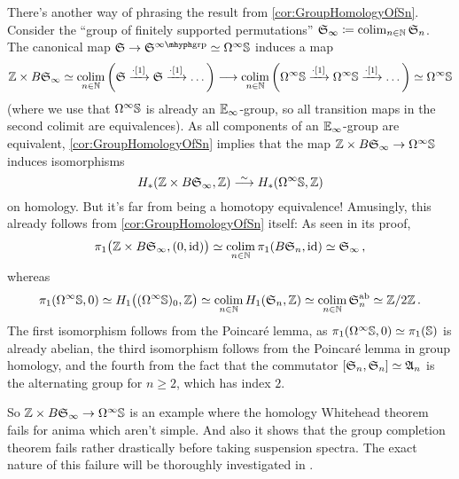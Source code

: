 \numpar*{\thesmallerdummy}
There's another way of phrasing the result from \cref{cor:GroupHomologyOfSn}. Consider the \enquote{group of finitely supported permutations} $\mathfrak{S}_\infty\coloneqq\operatorname*{colim}_{n\in\mathbb{N}}\mathfrak{S}_n$. The canonical map $\SS\morphism\SS^\inftygrp\simeq \Omega^\infty\IS$ induces a map
\begin{equation*}
	\IZ\times B\SS_\infty \simeq\colimit_{n\in\IN}\left(\SS\xrightarrow{\cdot[1]}\SS\xrightarrow{\cdot[1]}\dotso\right)\morphism \colimit_{n\in\IN}\left(\Omega^\infty\IS\xrightarrow{\cdot[1]}\Omega^\infty\IS\xrightarrow{\cdot[1]}\dotso\right)\simeq \Omega^\infty\IS
\end{equation*}
(where we use that $\Omega^\infty\mathbb{S}$ is already an $\mathbb{E}_\infty$-group, so all transition maps in the second colimit are equivalences). 
As all components of an $\mathbb{E}_\infty$-group are equivalent, \cref{cor:GroupHomologyOfSn} implies that the map $\IZ\times B\SS_\infty\morphism \Omega^\infty\IS$ induces isomorphisms
\begin{equation*}
	H_*(\IZ\times B\SS_\infty,\IZ)\isomorphism H_*(\Omega^\infty\IS,\IZ)
\end{equation*}
on homology. But it's far from being a homotopy equivalence! Amusingly, this already follows from \cref{cor:GroupHomologyOfSn} itself: As seen in its proof, 
\begin{equation*}
	\pi_1\big(\mathbb{Z}\times B\mathfrak{S}_\infty,(0,\operatorname{id})\big)\simeq \operatorname*{colim}_{n\in\mathbb{N}}\pi_1(B\mathfrak{S}_n,\operatorname{id})\simeq \mathfrak{S}_\infty\,,
\end{equation*}
whereas
\begin{equation*}
	\pi_1(\Omega^\infty\mathbb{S},0)\simeq H_1\big((\Omega^\infty\mathbb{S})_0,\mathbb{Z}\big)\simeq \operatorname*{colim}_{n\in\mathbb{N}} H_1(\mathfrak{S}_n,\mathbb{Z})\simeq \operatorname*{colim}_{n\in\mathbb{N}}\mathfrak{S}_n^{\mathrm{ab}}\simeq \mathbb{Z}/2\mathbb{Z}\,.
\end{equation*}
The first isomorphism follows from the Poincaré lemma, as $\pi_1(\Omega^\infty\mathbb{S},0)\simeq \pi_1(\mathbb{S})$ is already abelian, the third isomorphism follows from the Poincaré lemma in group homology, and the fourth from the fact that the commutator $[\mathfrak{S}_n,\mathfrak{S}_n]\simeq \mathfrak{A}_n$ is the alternating group for $n\geq 2$, which has index $2$.

So $\IZ\times B\SS_\infty\morphism \Omega^\infty\IS$ is an example where the homology Whitehead theorem fails for anima which aren't simple. And also it shows that the group completion theorem fails rather drastically before taking suspension spectra. The exact nature of this failure will be thoroughly investigated in .


